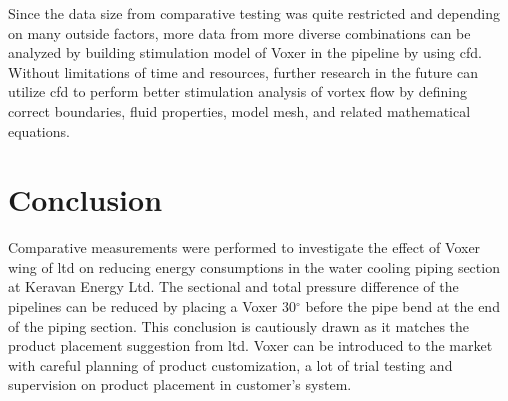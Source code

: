 Since the data size from comparative testing was quite restricted and depending on many outside factors, more data from more diverse combinations can be analyzed by building stimulation model of Voxer in the pipeline by using \gls{cfd}. Without limitations of time and resources, further research in the future can utilize \gls{cfd} to perform better stimulation analysis of vortex flow by defining correct boundaries, fluid properties, model mesh, and related mathematical equations. 

\section{Conclusion}

Comparative measurements were performed to investigate the effect of Voxer wing of \gls{ltd} on reducing energy consumptions in the water cooling piping section at Keravan Energy Ltd. The sectional and total pressure difference of the pipelines can be reduced by placing a Voxer 30$^{\circ}$ before the pipe bend at the end of the piping section. This conclusion is cautiously drawn as it matches the product placement suggestion from \gls{ltd}.  Voxer can be introduced to the market with careful planning of product customization, a lot of trial testing and supervision on product placement in customer's system. 

\clearpage %
